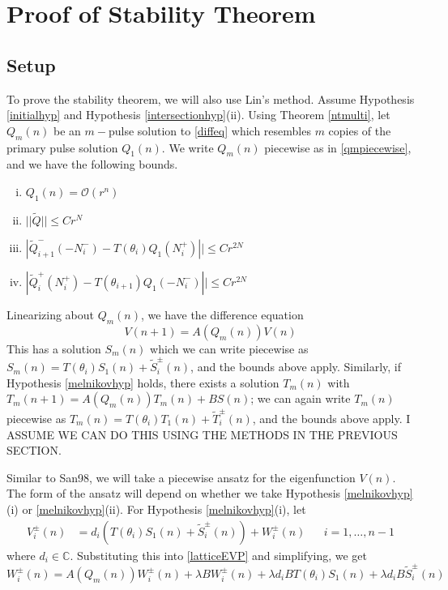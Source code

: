 \documentclass[12pt]{article}
\def\C{{\mathbb C}}
\begin{document}
\section{Proof of Stability Theorem}

\subsection{Setup}
To prove the stability theorem, we will also use Lin's method. Assume Hypothesis \ref{initialhyp} and Hypothesis \ref{intersectionhyp}(ii). Using Theorem \ref{ntmulti}, let $Q_m(n)$ be an $m-$pulse solution to \eqref{diffeq} which resembles $m$ copies of the primary pulse solution $Q_1(n)$. We write $Q_m(n)$ piecewise as in \eqref{qmpiecewise}, and we have the following bounds.
\begin{enumerate}[(i)]
\item $Q_1(n) = \mathcal{O}(r^n)$
\item $||\tilde{Q}|| \leq C r^N$
\item $|\tilde{Q}_{i+1}^-(-N_i^-) - T(\theta_i) Q_1(N_i^+)|| \leq C r^{2N}$ 
\item $|\tilde{Q}_i^+(N_i^+) - T(\theta_{i+1}) Q_1(-N_i^-)|| \leq C r^{2N}$
\end{enumerate}

Linearizing about $Q_m(n)$, we have the difference equation
\[
V(n+1) = A(Q_m(n))V(n)
\]
This has a solution $S_m(n)$ which we can write piecewise as $S_m(n) = T(\theta_i) S_1(n) + \tilde{S}_i^\pm(n)$, and the bounds above apply. Similarly, if Hypothesis \ref{melnikovhyp} holds, there exists a solution $T_m(n)$ with $T_m(n+1) = A(Q_m(n))T_m(n) + BS(n)$; we can again write $T_m(n)$ piecewise as $T_m(n) = T(\theta_i) T_1(n) + \tilde{T}_i^\pm(n)$, and the bounds above apply. I ASSUME WE CAN DO THIS USING THE METHODS IN THE PREVIOUS SECTION.

Similar to San98, we will take a piecewise ansatz for the eigenfunction $V(n)$. The form of the ansatz will depend on whether we take Hypothesis \ref{melnikovhyp}(i) or \ref{melnikovhyp}(ii). For Hypothesis \ref{melnikovhyp}(i), let
\begin{align*}
V_i^\pm(n) &= d_i ( T(\theta_i) S_1(n) + \tilde{S}_i^\pm(n) ) + W_i^\pm(n)
&& i = 1, \dots, n-1
\end{align*}
where $d_i \in \C$. Substituting this into \eqref{latticeEVP} and simplifying, we get
\[
W_i^\pm(n) = A(Q_m(n)) W_i^\pm(n) + \lambda B W_i^\pm(n) + \lambda d_i B T(\theta_i) S_1(n) + \lambda d_i B \tilde{S}_i^\pm(n)
\]
\end{document}
